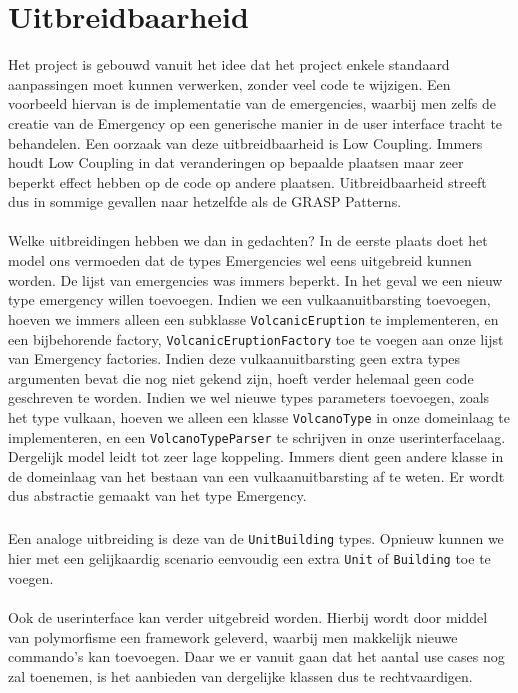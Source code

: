 \section{Uitbreidbaarheid}
\label{uitbreidbaarheid}
Het project is gebouwd vanuit het idee dat het project enkele standaard aanpassingen moet kunnen verwerken, zonder veel code te wijzigen. Een voorbeeld hiervan is de implementatie van de emergencies, waarbij men zelfs de creatie van de Emergency op een generische manier in de user interface tracht te behandelen. Een oorzaak van deze uitbreidbaarheid is Low Coupling. Immers houdt Low Coupling in dat veranderingen op bepaalde plaatsen maar zeer beperkt effect hebben op de code op andere plaatsen. Uitbreidbaarheid streeft dus in sommige gevallen naar hetzelfde als de GRASP Patterns.
\paragraph{}
Welke uitbreidingen hebben we dan in gedachten? In de eerste plaats doet het model ons vermoeden dat de types Emergencies wel eens uitgebreid kunnen worden. De lijst van emergencies was immers beperkt. In het geval we een nieuw type emergency willen toevoegen. Indien we een vulkaanuitbarsting toevoegen, hoeven we immers alleen een subklasse \verb+VolcanicEruption+ te implementeren, en een bijbehorende factory, \verb+VolcanicEruptionFactory+ toe te voegen aan onze lijst van Emergency factories. Indien deze vulkaanuitbarsting geen extra types argumenten bevat die nog niet gekend zijn, hoeft verder helemaal geen code geschreven te worden. Indien we wel nieuwe types parameters toevoegen, zoals het type vulkaan, hoeven we alleen een klasse \verb+VolcanoType+ in onze domeinlaag te implementeren, en een \verb+VolcanoTypeParser+ te schrijven in onze userinterfacelaag. Dergelijk model leidt tot zeer lage koppeling. Immers dient geen andere klasse in de domeinlaag van het bestaan van een vulkaanuitbarsting af te weten. Er wordt dus abstractie gemaakt van het type Emergency.
\subparagraph{}
Een analoge uitbreiding is deze van de \verb+UnitBuilding+ types. Opnieuw kunnen we hier met een gelijkaardig scenario eenvoudig een extra \verb+Unit+ of \verb+Building+ toe te voegen.
\paragraph{}
Ook de userinterface kan verder uitgebreid worden. Hierbij wordt door middel van polymorfisme een framework geleverd, waarbij men makkelijk nieuwe commando's kan toevoegen. Daar we er vanuit gaan dat het aantal use cases nog zal toenemen, is het aanbieden van dergelijke klassen dus te rechtvaardigen.
